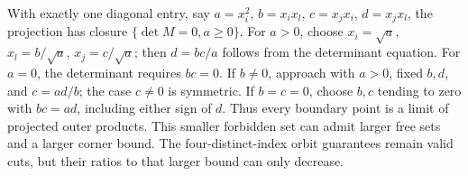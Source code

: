 With exactly one diagonal entry, say
$a=x_i^2$, $b=x_ix_l$, $c=x_jx_i$, $d=x_jx_l$, the projection has closure
$\{\det M=0,a\ge0\}$.
For $a>0$, choose $x_i=\sqrt a$, $x_l=b/\sqrt a$, $x_j=c/\sqrt a$;
then $d=bc/a$ follows from the determinant equation.
For $a=0$, the determinant requires $bc=0$.
If $b\ne0$, approach with $a>0$, fixed $b,d$, and $c=ad/b$;
the case $c\ne0$ is symmetric. If $b=c=0$, choose $b,c$ tending to zero
with $bc=ad$, including either sign of $d$.
Thus every boundary point is a limit of projected outer products.
This smaller forbidden set can admit larger free sets and a larger corner
bound. The four-distinct-index orbit guarantees remain valid cuts, but
their ratios to that larger bound can only decrease.
